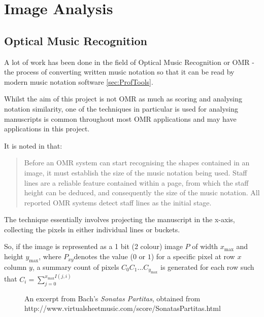 \section{Image Analysis}

\subsection{Optical Music Recognition}

A lot of work has been done in the field of Optical Music Recognition or OMR - the process of converting written music notation so that it can be read by modern music notation software \ref{sec:ProfTools}.

Whilst the aim of this project is not OMR as much as scoring and analysing notation similarity, one of the techniques in particular is used for analysing manuscripts is common throughout most OMR applications and may have applications in this project.

It is noted in \cite{bainbridge2001challenge} that:

\begin{quotation}
Before an OMR system can start recognising the shapes contained in an image, it must establish the size of the music notation being used. Staff lines are a reliable feature contained within a page, from which the staff height can be deduced, and consequently the size of the music notation. All reported OMR systems detect staff lines as the initial stage.
\end{quotation}

The technique essentially involves projecting the manuscript in the x-axis, collecting the pixels in either individual lines or buckets.

So, if the image is represented as a 1 bit (2 colour) image $P$ of width $x_{\text{max}}$ and height $y_{\text{max}}$, where $P_{xy}$denotes the value ($0$ or $1$) for a specific pixel at row $x$ column $y$, a summary count of pixels $C_0 C_1 ... C_{y_{\text{max}}}$ is generated for each row such that $C_i = \sum_{j = 0}^{x_\text{max} I(j, i)}$

\begin{figure}[h!]
  \centering
  \caption{An excerpt from Bach's \emph{Sonatas Partitas}, obtained from http://www.virtualsheetmusic.com/score/SonatasPartitas.html}
  \label{fig:SonatasPartitas}
\end{figure}

